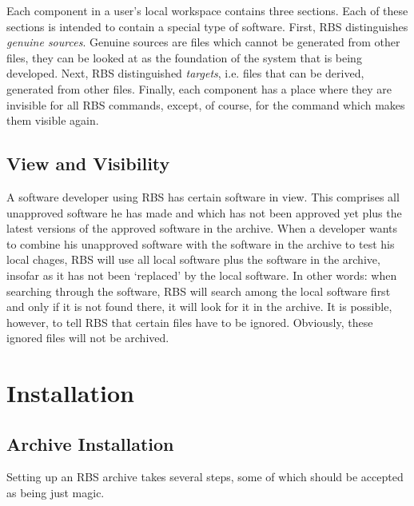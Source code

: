 Each component in a user's local workspace contains three sections. Each of 
these sections is intended to contain a special type of software. First, RBS
distinguishes
{\em genuine sources}. Genuine sources are files which cannot be generated from
other files, they can be looked at as the foundation of the system that is
being developed. Next, RBS distinguished {\em targets}, i.e. files that can be
derived, generated from other files. Finally, each component has a place
where they are invisible for all RBS commands, except, of course, 
for the command which makes them visible again.

\subsection{View and Visibility}
A software developer using RBS has certain software in view. This comprises all
unapproved software he has made and which has not been approved yet plus
the latest versions of the approved software in the archive. When a developer
wants to combine his unapproved software with the software in the archive to 
test his local chages, RBS will use all local software plus the software in the
archive, insofar as it has not been `replaced' by the local software. In other
words:
when searching through the software, RBS will search among the local software first and only if it is not found there, it will look for it in the archive.
It is possible, however, to tell RBS that certain files have to be ignored.
Obviously, these ignored files will not be archived.

\section{Installation}

\subsection{Archive Installation}

Setting up an RBS archive takes several steps, some of which should be accepted
as being just magic.


